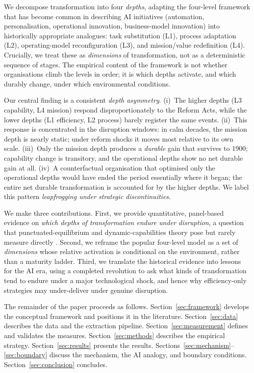 \documentclass[11pt]{article}
\begin{document}
We decompose transformation into four \emph{depths}, adapting the four-level framework that has
become common in describing AI initiatives (automation, personalisation, operational innovation,
business-model innovation) into historically appropriate analogues: task substitution (L1),
process adaptation (L2), operating-model reconfiguration (L3), and mission/value redefinition
(L4). Crucially, we treat these as \emph{dimensions} of transformation, not as a deterministic
sequence of stages. The empirical content of the framework is not whether organisations climb
the levels in order; it is which depths activate, and which durably change, under which
environmental conditions.

Our central finding is a consistent \emph{depth asymmetry}. (i)~The higher depths (L3 capability,
L4 mission) respond disproportionately to the Reform Acts, while the lower depths (L1 efficiency,
L2 process) barely register the same events. (ii)~This response is concentrated in the
disruption windows: in calm decades, the mission depth is nearly static; under reform shocks it
moves most relative to its own scale. (iii)~Only the mission depth produces a \emph{durable}
gain that survives to 1900; capability change is transitory, and the operational depths show
no net durable gain at all. (iv)~A counterfactual organisation that optimised only the
operational depths would have ended the period essentially where it began; the entire net
durable transformation is accounted for by the higher depths. We label this pattern
\emph{leapfrogging under strategic discontinuities}.

We make three contributions. First, we provide quantitative, panel-based evidence on
\emph{which depths of transformation endure under disruption}, a question that
punctuated-equilibrium and dynamic-capabilities theory pose but rarely measure directly
\citep{romanelli1994punctuated, teece1997dynamic}. Second, we reframe the popular four-level
model as a set of \emph{dimensions} whose relative activation is conditional on the environment,
rather than a maturity ladder. Third, we translate the historical evidence into lessons for the
AI era, using a completed revolution to ask what kinds of transformation tend to endure under a
major technological shock, and hence why efficiency-only strategies may under-deliver under genuine
disruption.

The remainder of the paper proceeds as follows. Section~\ref{sec:framework} develops the
conceptual framework and positions it in the literature. Section~\ref{sec:data} describes the
data and the extraction pipeline. Section~\ref{sec:measurement} defines and validates the
measures. Section~\ref{sec:methods} describes the empirical strategy. Section~\ref{sec:results}
presents the results. Sections~\ref{sec:mechanism}--\ref{sec:boundary} discuss the mechanism,
the AI analogy, and boundary conditions. Section~\ref{sec:conclusion} concludes.
\end{document}
